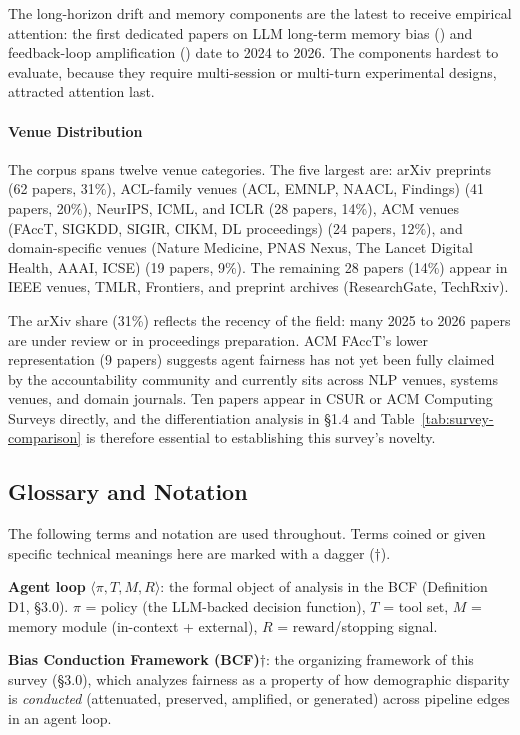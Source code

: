 \documentclass[acmsmall,nonacm]{acmart}
\begin{document}
The long-horizon drift and memory components are the latest to receive empirical attention: the first dedicated papers on LLM long-term memory bias (\cite{ma2026implicit}) and feedback-loop amplification (\cite{wyllie2024fairness,wang2026observations}) date to 2024 to 2026. The components hardest to evaluate, because they require multi-session or multi-turn experimental designs, attracted attention last.

\paragraph{Venue Distribution}

The corpus spans twelve venue categories. The five largest are: arXiv preprints (62 papers, 31\%), ACL-family venues (ACL, EMNLP, NAACL, Findings) (41 papers, 20\%), NeurIPS, ICML, and ICLR (28 papers, 14\%), ACM venues (FAccT, SIGKDD, SIGIR, CIKM, DL proceedings) (24 papers, 12\%), and domain-specific venues (Nature Medicine, PNAS Nexus, The Lancet Digital Health, AAAI, ICSE) (19 papers, 9\%). The remaining 28 papers (14\%) appear in IEEE venues, TMLR, Frontiers, and preprint archives (ResearchGate, TechRxiv).

The arXiv share (31\%) reflects the recency of the field: many 2025 to 2026 papers are under review or in proceedings preparation. ACM FAccT's lower representation (9 papers) suggests agent fairness has not yet been fully claimed by the accountability community and currently sits across NLP venues, systems venues, and domain journals. Ten papers appear in CSUR or ACM Computing Surveys directly, and the differentiation analysis in \S{}1.4 and Table~\ref{tab:survey-comparison} is therefore essential to establishing this survey's novelty.


\subsection{Glossary and Notation}

The following terms and notation are used throughout. Terms coined or given specific technical meanings here are marked with a dagger ($\dagger$).

\textbf{Agent loop} $\langle \pi, T, M, R \rangle$: the formal object of analysis in the BCF (Definition D1, \S{}3.0). $\pi$ = policy (the LLM-backed decision function), $T$ = tool set, $M$ = memory module (in-context + external), $R$ = reward/stopping signal.

\textbf{Bias Conduction Framework (BCF)$\dagger$}: the organizing framework of this survey (\S{}3.0), which analyzes fairness as a property of how demographic disparity is \emph{conducted} (attenuated, preserved, amplified, or generated) across pipeline edges in an agent loop.
\end{document}
